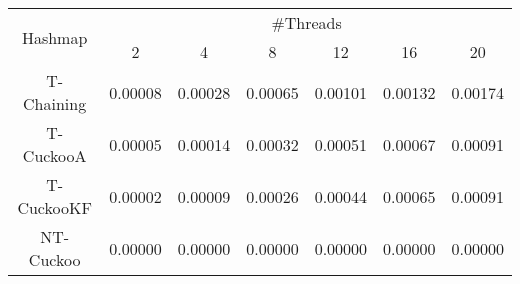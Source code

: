 \begin{tabular}{|c|c|c|c|c|c|c|}
\hline
\multirow{2}{*}{Hashmap} & \multicolumn{6}{c|}{\#Threads}\\\cline{2-7}& 2 & 4 & 8 & 12 & 16 & 20\\
\hline
\hline
T-Chaining & 0.00008 & 0.00028 & 0.00065 & 0.00101 & 0.00132 & 0.00174\\
T-CuckooA & 0.00005 & 0.00014 & 0.00032 & 0.00051 & 0.00067 & 0.00091\\
T-CuckooKF & 0.00002 & 0.00009 & 0.00026 & 0.00044 & 0.00065 & 0.00091\\
NT-Cuckoo & 0.00000 & 0.00000 & 0.00000 & 0.00000 & 0.00000 & 0.00000\\
\hline
\end{tabular}
